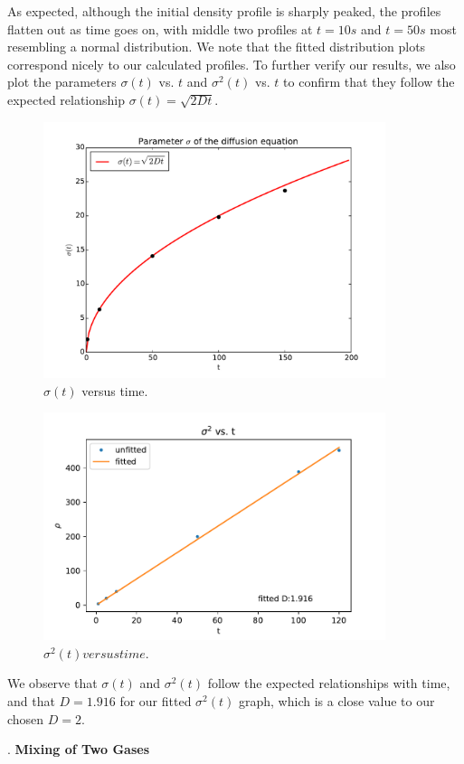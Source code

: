 \documentclass{article}
\begin{document}
\noindent As expected, although the initial density profile is sharply peaked, the profiles flatten out as time goes on, with middle two profiles at $t = 10 s$ and $t = 50 s$ most resembling a normal distribution. We note that the fitted distribution plots correspond nicely to our calculated profiles. To further verify our results, we also plot the parameters $\sigma(t)$ vs. $t$ and $\sigma^{2}(t)$ vs. $t$ to confirm that they follow the expected relationship $\sigma(t) = \sqrt{2Dt}$.\par
\begin{figure}[H]
\centering
\includegraphics[width=10cm]{figures/sigma.pdf}
\caption{$\sigma(t)$ versus time.}
\end{figure}
\begin{figure}[H]
\centering
\includegraphics[width=10cm]{figures/sigma2fit.pdf}
\caption{$\sigma^{2}(t) versus time.$}
\end{figure}
\noindent We observe that $\sigma(t)$ and $\sigma^{2}(t)$ follow the expected relationships with time, and that $D = 1.916$ for our fitted $\sigma^{2}(t)$ graph, which is a close value to our chosen $D = 2$.\par
\bigskip
{}. \textbf{Mixing of Two Gases}\par
\end{document}
